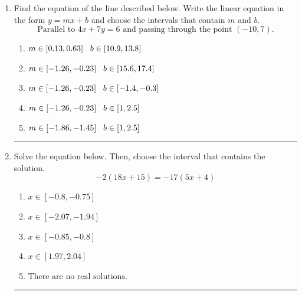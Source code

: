 \documentclass[14pt]{extbook}
\newcommand{\litem}[1]{\item#1\hspace*{-1cm}\rule{\textwidth}{0.4pt}}
\begin{document}
\begin{enumerate}
\litem{
Find the equation of the line described below. Write the linear equation in the form $ y=mx+b $ and choose the intervals that contain $m$ and $b$.\[ \text{Parallel to } 4 x + 7 y = 6 \text{ and passing through the point } (-10, 7). \]\begin{enumerate}[label=\Alph*.]
\item \( m \in [0.13, 0.63] \hspace*{3mm} b \in [10.9, 13.8] \)
\item \( m \in [-1.26, -0.23] \hspace*{3mm} b \in [15.6, 17.4] \)
\item \( m \in [-1.26, -0.23] \hspace*{3mm} b \in [-1.4, -0.3] \)
\item \( m \in [-1.26, -0.23] \hspace*{3mm} b \in [1, 2.5] \)
\item \( m \in [-1.86, -1.45] \hspace*{3mm} b \in [1, 2.5] \)

\end{enumerate} }
\litem{
Solve the equation below. Then, choose the interval that contains the solution.\[ -2(18x + 15) = -17(5x + 4) \]\begin{enumerate}[label=\Alph*.]
\item \( x \in [-0.8, -0.75] \)
\item \( x \in [-2.07, -1.94] \)
\item \( x \in [-0.85, -0.8] \)
\item \( x \in [1.97, 2.04] \)
\item \( \text{There are no real solutions.} \)


\end{enumerate}}
\end{enumerate}
\end{document}
